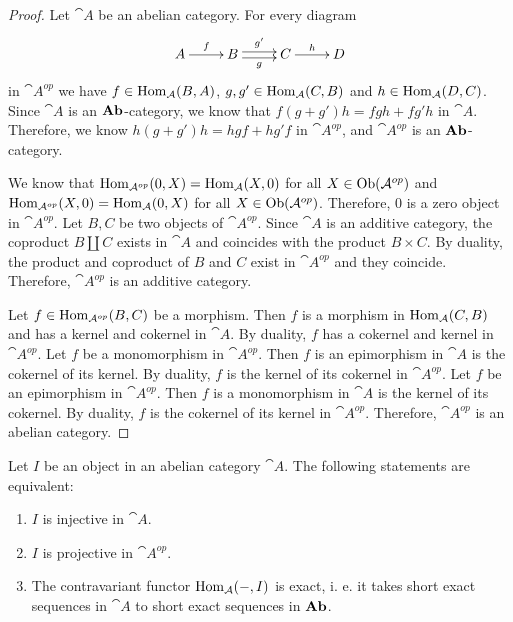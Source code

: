 \begin{proof}
	Let $\cat{A}$ be an abelian category.
	For every diagram
	\[
		\xymatrix{
			A \ar[r]^f &B \ar@<-.5ex>[r]_g \ar@<.5ex>[r]^{g'} &C \ar[r]^h &D
		}
	\]
	in $\cat{A}^{op}$ we have $f \in \operatorname{Hom}_{\mathcal{A}}(B, A)$, $g,g' \in \operatorname{Hom}_{\mathcal{A}}(C, B)$ and $h \in \operatorname{Hom}_{\mathcal{A}}(D,C)$.
	Since $\cat{A}$ is an $\textrm{\textup{\textbf{Ab}}}$-category, we know that $f(g+g')h = fgh + fg'h$ in $\cat{A}$.
	Therefore, we know $h(g+g')h = hgf + hg'f$ in $\cat{A}^{op}$, and $\cat{A}^{op}$ is an $\textrm{\textup{\textbf{Ab}}}$-category.
	
	We know that $\operatorname{Hom}_{\mathcal{A}^{op}}(0,X) = \operatorname{Hom}_{\mathcal{A}}(X,0)$ for all $X \in \operatorname{Ob}(\mathcal{A}^{op})$ and $\operatorname{Hom}_{\mathcal{A}^{op}}(X,0) = \operatorname{Hom}_{\mathcal{A}}(0,X)$ for all $X \in \operatorname{Ob}(\mathcal{A}^{op})$.
	Therefore, $0$ is a zero object in $\cat{A}^{op}$.
	Let $B,C$ be two objects of $\cat{A}^{op}$.
	Since $\cat{A}$ is an additive category, the coproduct $B\coprod C$ exists in $\cat{A}$ and coincides with the product $B\times C$.
	By duality, the product and coproduct of $B$ and $C$ exist in $\cat{A}^{op}$ and they coincide.
	Therefore, $\cat{A}^{op}$ is an additive category.
	
	Let $f \in \operatorname{Hom}_{\mathcal{A}^{op}}(B,C)$ be a morphism.
	Then $f$ is a morphism in $\operatorname{Hom}_{\mathcal{A}}(C,B)$ and has a kernel and cokernel in $\cat{A}$.
	By duality, $f$ has a cokernel and kernel in $\cat{A}^{op}$.
	Let $f$ be a monomorphism in $\cat{A}^{op}$.
	Then $f$ is an epimorphism in $\cat{A}$ is the cokernel of its kernel.
	By duality, $f$ is the kernel of its cokernel in $\cat{A}^{op}$.
	Let $f$ be an epimorphism in $\cat{A}^{op}$.
	Then $f$ is a monomorphism in $\cat{A}$ is the kernel of its cokernel.
	By duality, $f$ is the cokernel of its kernel in $\cat{A}^{op}$.
	Therefore, $\cat{A}^{op}$ is an abelian category.
\end{proof}

\begin{lemma}
	Let $I$ be an object in an abelian category $\cat{A}$. The following statements are equivalent:
	\begin{enumerate}[label=(\roman*)]
		\item $I$ is injective in $\cat{A}$.
		
		\item $I$ is projective in $\cat{A}^{op}$.
		
		\item The contravariant functor $\operatorname{Hom}_{\mathcal{A}}(-,I)$ is exact, i. e. it takes short exact sequences in $\cat{A}$ to short exact sequences in $\textrm{\textup{\textbf{Ab}}}$.
	\end{enumerate}
\end{lemma}

